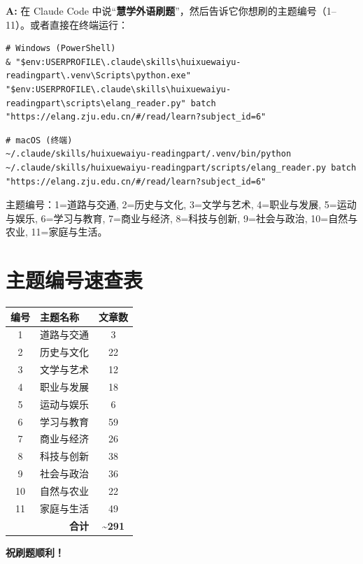 \documentclass[12pt,a4paper]{ctexart}
\begin{document}
\begin{tipbox}
  \textbf{A:} 在 Claude Code
  中说``\textbf{慧学外语刷题}''，然后告诉它你想刷的主题编号（1--11）。或者直接在终端运行：
    \begin{lstlisting}[language={},breaklines=true]
# Windows (PowerShell)
& "$env:USERPROFILE\.claude\skills\huixuewaiyu-readingpart\.venv\Scripts\python.exe" "$env:USERPROFILE\.claude\skills\huixuewaiyu-readingpart\scripts\elang_reader.py" batch "https://elang.zju.edu.cn/#/read/learn?subject_id=6"
\end{lstlisting}
    \begin{lstlisting}[language={},breaklines=true]
# macOS (终端)
~/.claude/skills/huixuewaiyu-readingpart/.venv/bin/python ~/.claude/skills/huixuewaiyu-readingpart/scripts/elang_reader.py batch "https://elang.zju.edu.cn/#/read/learn?subject_id=6"
\end{lstlisting}
  主题编号：1=道路与交通, 2=历史与文化, 3=文学与艺术, 4=职业与发展, 5=运动与娱乐,
  6=学习与教育, 7=商业与经济, 8=科技与创新, 9=社会与政治, 10=自然与农业, 11=家庭与生活。
\end{tipbox}

\newpage
\section{主题编号速查表}

\begin{center}
  \begin{tabular}{|c|l|c|}
    \hline
    \textbf{编号} & \textbf{主题名称} & \textbf{文章数} \\
    \hline
    1 & 道路与交通 & 3 \\
    2 & 历史与文化 & 22 \\
    3 & 文学与艺术 & 12 \\
    4 & 职业与发展 & 18 \\
    5 & 运动与娱乐 & 6 \\
    6 & 学习与教育 & 59 \\
    7 & 商业与经济 & 26 \\
    8 & 科技与创新 & 38 \\
    9 & 社会与政治 & 36 \\
    10 & 自然与农业 & 22 \\
    11 & 家庭与生活 & 49 \\
    \hline
    \multicolumn{2}{|r|}{\textbf{合计}} & \textbf{\textasciitilde291} \\
    \hline
  \end{tabular}
\end{center}

\vspace{10mm}

\begin{center}
  \large\color{primary}\textbf{祝刷题顺利！\faSmile{}}
\end{center}
\end{document}
